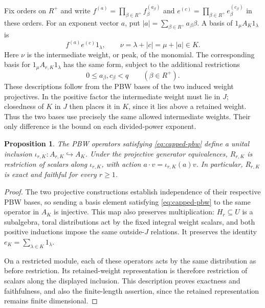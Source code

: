 \documentclass[11pt,reqno]{amsart}
\newtheorem{proposition}[theorem]{Proposition}
\theoremstyle{definition}
\theoremstyle{remark}
\numberwithin{equation}{section}
\begin{document}
Fix orders on $R^+$ and write
$f^{(a)}=\prod_{\beta\in R^+}f_\beta^{(a_\beta)}$ and
$e^{(c)}=\prod_{\beta\in R^+}e_\beta^{(c_\beta)}$ in these orders.
For an exponent vector $a$, put
$|a|=\sum_{\beta\in R^+}a_\beta\beta$.
A basis of $1_\mu A_K1_\lambda$ is
\begin{equation}\label{eq:peak-basis}
 f^{(a)}e^{(c)}1_\lambda,
 \qquad \nu=\lambda+|c|=\mu+|a|\in K.
\end{equation}
Here $\nu$ is the intermediate weight, or peak, of the monomial.
The corresponding basis for $1_\mu A_{r,K}1_\lambda$ has the
same form, subject to the additional restrictions
\begin{equation}\label{eq:capped-pbw}
 0\leq a_\beta,c_\beta<q\qquad(\beta\in R^+).
\end{equation}
These descriptions follow from the PBW bases of the two induced
weight projectives. In the positive factor the intermediate weight
must lie in $J$; closedness of $K$ in $J$ then places it in $K$, since
it lies above a retained weight. Thus the two bases use precisely
the same allowed intermediate weights. Their only difference is
the bound on each divided-power exponent.

\begin{proposition}\label{prop:actual-inclusion}
The PBW operators satisfying \eqref{eq:capped-pbw} define a unital
inclusion $\iota_{r,K}:A_{r,K}\hookrightarrow A_K$. Under the projective
generator equivalences, $R_{r,K}$ is restriction of scalars along
$\iota_{r,K}$, with action $a\cdot v=\iota_{r,K}(a)v$.
In particular, $R_{r,K}$ is exact and faithful for every $r\geq1$.
\end{proposition}

\begin{proof}
The two projective constructions establish independence of their
respective PBW bases, so sending a basis element satisfying
\eqref{eq:capped-pbw} to the
same operator in $A_K$ is injective. This map also preserves
multiplication: $H_r\subseteq U$ is a subalgebra, toral distributions
act by the fixed integral weight scalars, and both positive
inductions impose the same outside-$J$ relations. It preserves
the identity $e_K=\sum_{\lambda\in K}1_\lambda$.

On a restricted module, each of these operators acts by the same
distribution as before restriction. Its retained-weight
representation is therefore restriction of scalars along the
displayed inclusion. This description proves exactness and
faithfulness, and also the finite-length assertion, since the
retained representation remains finite dimensional.
\end{proof}
\end{document}
